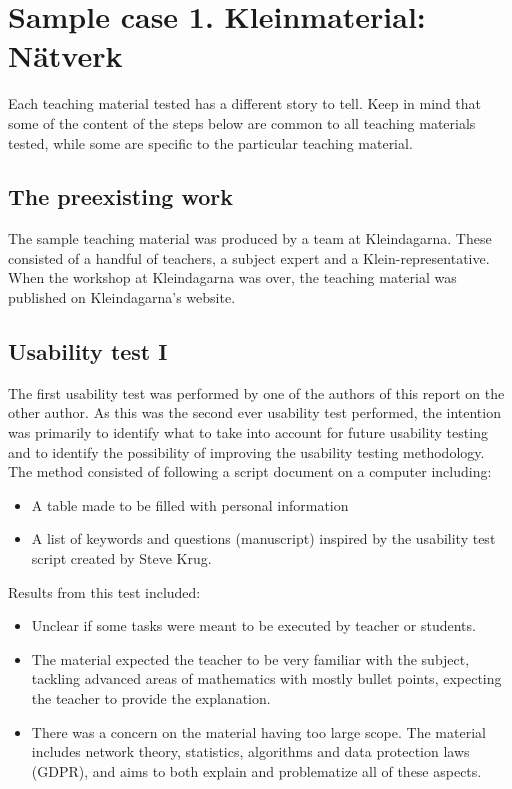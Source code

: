 \section{Sample case 1. Kleinmaterial: Nätverk} \label{samplecase1}
Each teaching material tested has a different story to tell. Keep in mind that some of the content of the steps below are common to all teaching materials tested, while some are specific to the particular teaching material.

\subsection{The preexisting work}
The sample teaching material was produced by a team at Kleindagarna. These consisted of a handful of teachers, a subject expert and a Klein-representative. When the workshop at Kleindagarna was over, the teaching material was published on Kleindagarna's website. 

\subsection{Usability test I}
The first usability test was performed by one of the authors of this report on the other author. As this was the second ever usability test performed, the intention was primarily to identify what to take into account for future usability testing and to identify the possibility of improving the usability testing methodology. The method consisted of following a script document on a computer including:
\begin{itemize}
    \item A table made to be filled with personal information
    \item A list of keywords and questions (manuscript) inspired by the usability test script created by Steve Krug.
\end{itemize}

Results from this test included:
\begin{itemize}
    \item Unclear if some tasks were meant to be executed by teacher or students.
    \item The material expected the teacher to be very familiar with the subject, tackling advanced areas of mathematics with mostly bullet points, expecting the teacher to provide the explanation.
    \item There was a concern on the material having too large scope. The material includes network theory, statistics, algorithms and data protection laws (GDPR), and aims to both explain and problematize all of these aspects.
\end{itemize}
